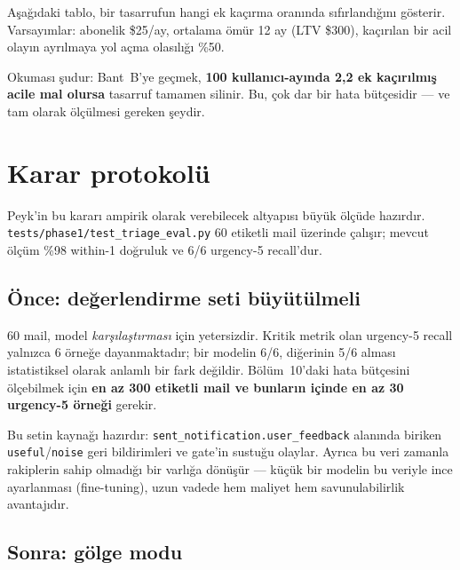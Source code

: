 \documentclass[11pt,a4paper]{article}
\newcommand{\code}[1]{\texttt{\small #1}}
\begin{document}
Aşağıdaki tablo, bir tasarrufun hangi ek kaçırma oranında sıfırlandığını gösterir.
Varsayımlar: abonelik \$25/ay, ortalama ömür 12 ay (LTV \$300), kaçırılan bir acil olayın
ayrılmaya yol açma olasılığı \%50.

\begin{table}[h]
\centering\small

\caption{``Başabaş ek kaçırma'', 100 kullanıcı-ayında kaç ek kaçırılmış acilin tasarrufu
sıfırladığını gösterir.}
\end{table}

Okuması şudur: Bant~B'ye geçmek, \textbf{100 kullanıcı-ayında 2{,}2 ek kaçırılmış acile
mal olursa} tasarruf tamamen silinir. Bu, çok dar bir hata bütçesidir --- ve tam olarak
ölçülmesi gereken şeydir.

\section{Karar protokolü}

Peyk'in bu kararı ampirik olarak verebilecek altyapısı büyük ölçüde hazırdır.
\code{tests/phase1/}\allowbreak\code{test\_triage\_eval.py} 60 etiketli mail üzerinde çalışır; mevcut ölçüm
\%98 within-1 doğruluk ve 6/6 urgency-5 recall'dur.

\subsection{Önce: değerlendirme seti büyütülmeli}

60 mail, model \emph{karşılaştırması} için yetersizdir. Kritik metrik olan urgency-5
recall yalnızca 6 örneğe dayanmaktadır; bir modelin 6/6, diğerinin 5/6 alması istatistiksel
olarak anlamlı bir fark değildir. Bölüm~10'daki hata bütçesini ölçebilmek için
\textbf{en az 300 etiketli mail ve bunların içinde en az 30 urgency-5 örneği} gerekir.

Bu setin kaynağı hazırdır: \code{sent\_notification.user\_feedback} alanında biriken
\code{useful}/\code{noise} geri bildirimleri ve gate'in sustuğu olaylar. Ayrıca bu veri
zamanla rakiplerin sahip olmadığı bir varlığa dönüşür --- küçük bir modelin bu veriyle
ince ayarlanması (fine-tuning), uzun vadede hem maliyet hem savunulabilirlik avantajıdır.

\subsection{Sonra: gölge modu}
\end{document}

